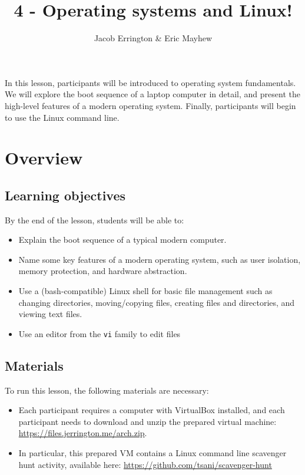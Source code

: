 \documentclass[11pt]{article}
\title{4 - Operating systems and Linux!}
\author{Jacob Errington \& Eric Mayhew}
\date{}
\begin{document}
\maketitle

In this lesson, participants will be introduced to operating system
fundamentals. We will explore the boot sequence of a laptop computer in detail,
and present the high-level features of a modern operating system.
Finally, participants will begin to use the Linux command line.

\section*{Overview}

\subsection*{Learning objectives}

By the end of the lesson, students will be able to:
\begin{itemize}
\item
  Explain the boot sequence of a typical modern computer.
\item
  Name some key features of a modern operating system, such as user isolation,
  memory protection, and hardware abstraction.
\item
  Use a (bash-compatible) Linux shell for basic file management such as changing
  directories, moving/copying files, creating files and directories, and viewing
  text files.
\item
  Use an editor from the \texttt{vi} family to edit files
\end{itemize}

\subsection*{Materials}

To run this lesson, the following materials are necessary:

\begin{itemize}
\item
  Each participant requires a computer with VirtualBox installed, and each
  participant needs to download and unzip the prepared virtual machine:
  \url{https://files.jerrington.me/arch.zip}.

\item
  In particular, this prepared VM contains a Linux command line scavenger hunt
  activity, available here:
  \url{https://github.com/tsani/scavenger-hunt}
\end{itemize}
\end{document}
